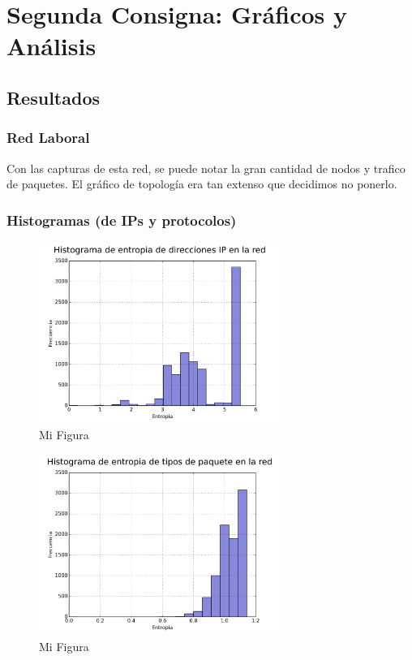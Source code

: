\section{Segunda Consigna: Gráficos y Análisis}

\subsection{Resultados}

\subsubsection{Red Laboral}

Con las capturas de esta red, se puede notar la gran cantidad de nodos y trafico de paquetes.
El gráfico de topología era tan extenso que decidimos no ponerlo.

\FloatBarrier

\subsubsection{Histogramas (de IPs y protocolos)}

\begin{figure}[h!]
  \centering
   \includegraphics[width=0.7\textwidth]{graficos/red_baufest_hist_arp.png}
  \caption{Mi Figura}
  \label{fig:red_baufest_hist_arp}
\end{figure}

\begin{figure}[h!]
  \centering
   \includegraphics[width=0.7\textwidth]{graficos/red_baufest_hist_type.png}
  \caption{Mi Figura}
  \label{fig:red_baufest_hist_type}
\end{figure}

